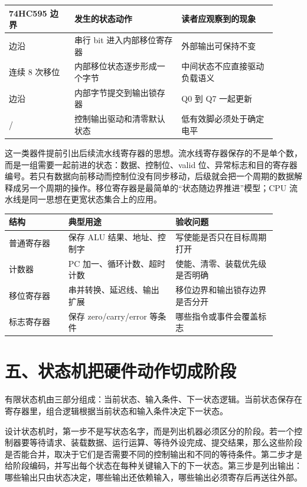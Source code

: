 \begin{longtable}{L{0.22\linewidth}L{0.36\linewidth}L{0.32\linewidth}}
\toprule
74HC595 边界 & 发生的状态动作 & 读者应观察到的现象 \\
\midrule
{} 边沿 & 串行 bit 进入内部移位寄存器 & 外部输出可保持不变 \\
连续 8 次移位 & 内部移位状态逐步形成一个字节 & 中间状态不应直接驱动负载语义 \\
 边沿 & 内部字节提交到输出锁存器 & Q0 到 Q7 一起更新 \\
/ & 控制输出驱动和清零默认状态 & 低有效脚必须处于确定电平 \\
\bottomrule
\end{longtable}

这一类器件提前引出后续流水线寄存器的思想。流水线寄存器保存的不是单个数，而是一组需要一起前进的状态：数据、控制位、valid 位、异常标志和目的寄存器编号。若只有数据向前移动而控制位没有同步移动，后级就会把一个周期的数据解释成另一个周期的操作。移位寄存器是最简单的“状态随边界推进”模型；CPU 流水线是同一思想在更宽状态集合上的应用。

\begin{longtable}{L{0.2\linewidth}L{0.36\linewidth}L{0.34\linewidth}}
\toprule
结构 & 典型用途 & 验收问题 \\
\midrule
普通寄存器 & 保存 ALU 结果、地址、控制字 & 写使能是否只在目标周期打开 \\
计数器 & PC 加一、循环计数、超时计数 & 使能、清零、装载优先级是否明确 \\
移位寄存器 & 串并转换、延迟线、输出扩展 & 移位边界和输出锁存边界是否分开 \\
标志寄存器 & 保存 zero/carry/error 等条件 & 哪些指令或事件会覆盖标志 \\
\bottomrule
\end{longtable}

\section{五、状态机把硬件动作切成阶段}

有限状态机由三部分组成：当前状态、输入条件、下一状态逻辑。当前状态保存在寄存器里，组合逻辑根据当前状态和输入条件决定下一状态。


设计状态机时，第一步不是写状态名字，而是列出机器必须区分的阶段。若一个控制器要等待请求、装载数据、运行运算、等待外设完成、提交结果，那么这些阶段是否能合并，取决于它们是否需要不同的控制输出和不同的等待条件。第二步才是给阶段编码，并写出每个状态在每种关键输入下的下一状态。第三步是列出输出：哪些输出只由状态决定，哪些输出还依赖输入，哪些输出必须寄存后再送往外部。

